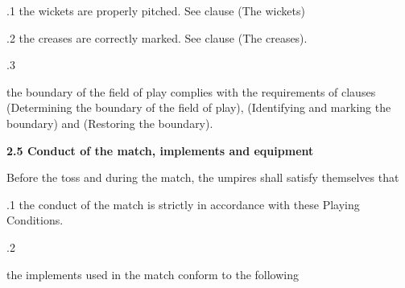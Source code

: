 \documentclass[12pt]{article}
\begin{document}
\vspace{\baselineskip}
{\fontsize{9pt}{10.8pt}.1 \tabto{0.49in} the wickets are properly pitched. See clause (The wickets)\par}\par


\vspace{\baselineskip}
{\fontsize{9pt}{10.8pt}.2 \tabto{0.49in} the creases are correctly marked. See clause (The creases).\par}\par


\vspace{\baselineskip}
\begin{adjustwidth}{0.5in}{0.11in}
{\fontsize{9pt}{10.8pt}.3 \tabto{0.49in} {\fontsize{8pt}{9.6pt}\selectfont the boundary of the field of play complies with the requirements of clauses (Determining the boundary of the field of play), (Identifying and marking the boundary) and (Restoring the boundary).\par}\par}\par

\end{adjustwidth}


\vspace{\baselineskip}
{\fontsize{11pt}{13.2pt}\selectfont \textbf{2.5 \tabto{0.47in} Conduct of the match, implements and equipment}\par}\par


\vspace{\baselineskip}
{\fontsize{9pt}{10.8pt}\selectfont Before the toss and during the match, the umpires shall satisfy themselves that\par}\par


\vspace{\baselineskip}
{\fontsize{9pt}{10.8pt}.1 \tabto{0.49in} the conduct of the match is strictly in accordance with these Playing Conditions.\par}\par


\vspace{\baselineskip}
{\fontsize{9pt}{10.8pt}.2 \tabto{0.49in} {\fontsize{8pt}{9.6pt}\selectfont the implements used in the match conform to the following\par}\par}\par
\end{document}
